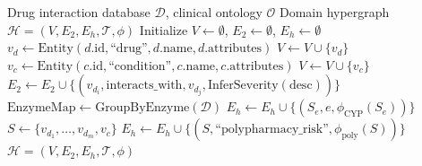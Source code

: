 \documentclass[11pt,a4paper]{article}
\begin{document}
\begin{algorithm}[H]
\caption{Hypergraph Construction from Domain Data}
\label{alg:hypergraph_construction}
\begin{algorithmic}[1]
\REQUIRE Drug interaction database $\mathcal{D}$, clinical ontology $\mathcal{O}$
\ENSURE Domain hypergraph $\mathcal{H} = (V, E_2, E_h, \mathcal{T}, \phi)$
\STATE Initialize $V \leftarrow \emptyset$, $E_2 \leftarrow \emptyset$, $E_h \leftarrow \emptyset$
    \STATE $v_d \leftarrow \text{Entity}(d.\text{id}, \text{``drug''}, d.\text{name}, d.\text{attributes})$
    \STATE $V \leftarrow V \cup \{v_d\}$
\ENDFOR
{}
    \STATE $v_c \leftarrow \text{Entity}(c.\text{id}, \text{``condition''}, c.\text{name}, c.\text{attributes})$
    \STATE $V \leftarrow V \cup \{v_c\}$
\ENDFOR
\STATE {}
    \STATE $E_2 \leftarrow E_2 \cup \{(v_{d_i}, \text{interacts\_with}, v_{d_j}, \text{InferSeverity}(\text{desc}))\}$
\ENDFOR
\STATE {}
\STATE $\text{EnzymeMap} \leftarrow \text{GroupByEnzyme}(\mathcal{D})$
        \STATE $E_h \leftarrow E_h \cup \{(S_e, e, \phi_{\text{CYP}}(S_e))\}$
    \ENDIF
\ENDFOR
\STATE {}
    \STATE $S \leftarrow \{v_{d_1}, \ldots, v_{d_m}, v_c\}$
    \STATE $E_h \leftarrow E_h \cup \{(S, \text{``polypharmacy\_risk''}, \phi_{\text{poly}}(S))\}$
\ENDFOR
\RETURN $\mathcal{H} = (V, E_2, E_h, \mathcal{T}, \phi)$
\end{algorithmic}
\end{algorithm}
\end{document}
